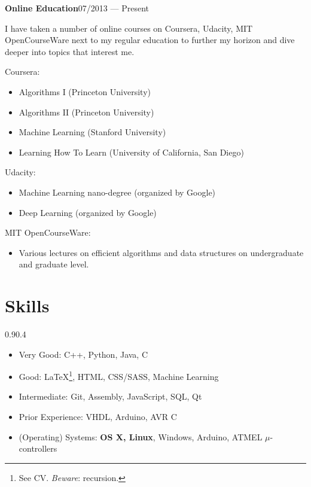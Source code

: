 \vspace{-2mm}
\begin{entry}{\textbf{Online Education}}{}{07/2013 --- Present}
  \item I have taken a number of online courses on Coursera, Udacity, MIT OpenCourseWare next to my regular education to further my horizon and dive deeper into topics that interest me.
  \item Coursera:
  \begin{itemize}
    \item Algorithms I (Princeton University)
    \item Algorithms II (Princeton University)
    \item Machine Learning (Stanford University)
    \item Learning How To Learn (University of California, San Diego)
  \end{itemize}
  \item Udacity:
  \begin{itemize}
    \item Machine Learning nano-degree (organized by Google)
    \item Deep Learning (organized by Google)
  \end{itemize}
  \item MIT OpenCourseWare:
  \begin{itemize}
    \item Various lectures on efficient algorithms and data structures on undergraduate and graduate level.
  \end{itemize}
\end{entry}

\section{Skills}{0.9}{0.4}
\vspace{-2mm}
\begin{multicols}{2}
	\begin{itemize}
    \item Very Good: C++, Python, Java, C
		\item Good: \LaTeX\footnote{See CV. \emph{Beware}: recursion.}, HTML,
      CSS/SASS, Machine Learning
		\item Intermediate: Git, Assembly, JavaScript, SQL, Qt
		\item Prior Experience: VHDL, Arduino, AVR C
		\item (Operating) Systems: \textbf{OS X, Linux}, Windows, Arduino, ATMEL $\mu$-controllers
    \\
	\end{itemize}
\end{multicols}

